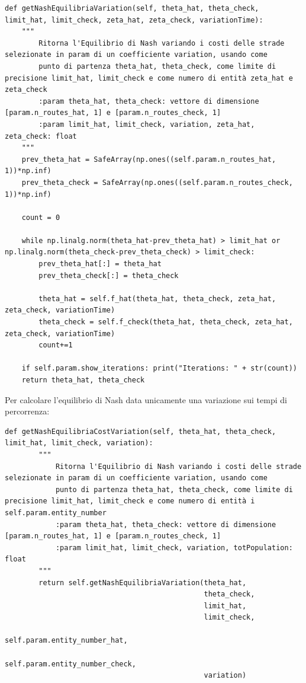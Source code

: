 \begin{lstlisting}[style=myStile, caption={Computer::getNashEquilibriaVariation}, label={script:9}]
def getNashEquilibriaVariation(self, theta_hat, theta_check, limit_hat, limit_check, zeta_hat, zeta_check, variationTime):
    """
        Ritorna l'Equilibrio di Nash variando i costi delle strade selezionate in param di un coefficiente variation, usando come
        punto di partenza theta_hat, theta_check, come limite di precisione limit_hat, limit_check e come numero di entità zeta_hat e zeta_check
        :param theta_hat, theta_check: vettore di dimensione [param.n_routes_hat, 1] e [param.n_routes_check, 1]
        :param limit_hat, limit_check, variation, zeta_hat, zeta_check: float
    """
    prev_theta_hat = SafeArray(np.ones((self.param.n_routes_hat, 1))*np.inf)
    prev_theta_check = SafeArray(np.ones((self.param.n_routes_check, 1))*np.inf)
    
    count = 0
    
    while np.linalg.norm(theta_hat-prev_theta_hat) > limit_hat or np.linalg.norm(theta_check-prev_theta_check) > limit_check:
        prev_theta_hat[:] = theta_hat
        prev_theta_check[:] = theta_check
        
        theta_hat = self.f_hat(theta_hat, theta_check, zeta_hat, zeta_check, variationTime)
        theta_check = self.f_check(theta_hat, theta_check, zeta_hat, zeta_check, variationTime)
        count+=1
    
    if self.param.show_iterations: print("Iterations: " + str(count))
    return theta_hat, theta_check
\end{lstlisting}

Per calcolare l'equilibrio di Nash data unicamente una variazione sui tempi di percorrenza:
\begin{lstlisting}[style=myStile, caption={Computer::getNashEquilibriaCostVariation}, label={script:15}]
    def getNashEquilibriaCostVariation(self, theta_hat, theta_check, limit_hat, limit_check, variation):
        """
            Ritorna l'Equilibrio di Nash variando i costi delle strade selezionate in param di un coefficiente variation, usando come
            punto di partenza theta_hat, theta_check, come limite di precisione limit_hat, limit_check e come numero di entità i self.param.entity_number
            :param theta_hat, theta_check: vettore di dimensione [param.n_routes_hat, 1] e [param.n_routes_check, 1]
            :param limit_hat, limit_check, variation, totPopulation: float
        """
        return self.getNashEquilibriaVariation(theta_hat, 
                                               theta_check, 
                                               limit_hat, 
                                               limit_check, 
                                               self.param.entity_number_hat, 
                                               self.param.entity_number_check, 
                                               variation)
\end{lstlisting}

